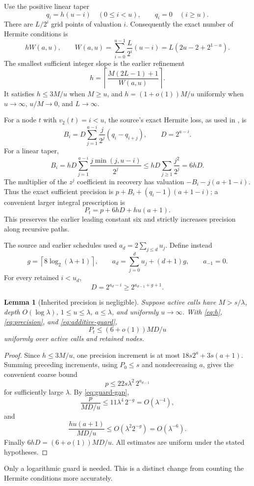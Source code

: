 \documentclass[11pt,letterpaper]{article}
\numberwithin{equation}{section}
\newtheorem{lemma}[theorem]{Lemma}
\theoremstyle{definition}\newtheorem{definition}[theorem]{Definition}
\theoremstyle{remark}\newtheorem{remark}[theorem]{Remark}
\newcommand{\ceil}[1]{\left\lceil #1\right\rceil}
\begin{document}
Use the positive linear taper
\[
 q_i=h(u-i)\quad(0\le i<u),\qquad q_i=0\quad(i\ge u).
\]
There are $L/2^i$ grid points of valuation $i$. Consequently the exact
number of Hermite conditions is
\[
 hW(a,u),\qquad
 W(a,u)=\sum_{i=0}^{u-1}\frac L{2^i}(u-i)
       =L(2u-2+2^{1-u}).
\]
The smallest sufficient integer slope is the earlier refinement
\begin{equation}
 h=\ceil{\frac{M(2L-1)+1}{W(a,u)}}.\label{eq:h}
\end{equation}
It satisfies $h\le3M/u$ when $M\ge u$, and
$h=(1+o(1))M/u$ uniformly when $u\to\infty$, $u/M\to0$, and $L\to\infty$.

For a node $t$ with $v_2(t)=i<u$, the source's exact Hermite loss,
as used in \cite{precisionpacket}, is
\[
 B_i=D\sum_{j=1}^{a-i}\frac j{2^j}(q_i-q_{i+j}),
 \qquad D=2^{a-i}.
\]
For a linear taper,
\[
 B_i=hD\sum_{j=1}^{a-i}\frac{j\min(j,u-i)}{2^j}
 \le hD\sum_{j\ge1}\frac{j^2}{2^j}=6hD.
\]
The multiplier of the $z^j$ coefficient in recovery has valuation
$-B_i-j(a+1-i)$. Thus the exact sufficient precision is
$p+B_i+(q_i-1)(a+1-i)$; a convenient larger integral prescription is
\begin{equation}
 P_t=p+6hD+hu(a+1).\label{eq:precision}
\end{equation}
This preserves the earlier leading constant six and strictly increases
precision along recursive paths.

The source and earlier schedules used $a_d=2\sum_{j\le d}u_j$. Define instead
\begin{equation}
 g=\ceil{8\log_2(\lambda+1)},\qquad
 a_d=\sum_{j=0}^d u_j+(d+1)g,\qquad a_{-1}=0.
 \label{eq:additive-guard}
\end{equation}
For every retained $i<u_d$,
\begin{equation}
 D=2^{a_d-i}\ge2^{a_{d-1}+g+1}.\label{eq:guard-gap}
\end{equation}

\begin{lemma}[Inherited precision is negligible]\label{lem:precision-guard}
Suppose active calls have $M>s/\lambda$, depth $O(\log\lambda)$,
$1\le u\le\lambda$, $a\le\lambda$, and uniformly $u\to\infty$.
With \eqref{eq:h}, \eqref{eq:precision}, and \eqref{eq:additive-guard},
\[
 P_t\le(6+o(1))MD/u
\]
uniformly over active calls and retained nodes.
\end{lemma}
\begin{proof}
Since $h\le3M/u$, one precision increment is at most
$18s2^a+3s(a+1)$. Summing preceding increments, using $P_0\le s$
and nondecreasing $a$, gives the convenient coarse bound
\[
 p\le22s\lambda^2\,2^{a_{d-1}}
\]
for sufficiently large $\lambda$. By \eqref{eq:guard-gap},
\[
 \frac{p}{MD/u}
 \le11\lambda^4\,2^{-g}=O(\lambda^{-4}),
\]
and
\[
 \frac{hu(a+1)}{MD/u}
 \le O(\lambda^2 2^{-g})=O(\lambda^{-6}).
\]
Finally $6hD=(6+o(1))MD/u$. All estimates are uniform under the
stated hypotheses.
\end{proof}
Only a logarithmic guard is needed. This is a distinct change from
counting the Hermite conditions more accurately.
\end{document}
